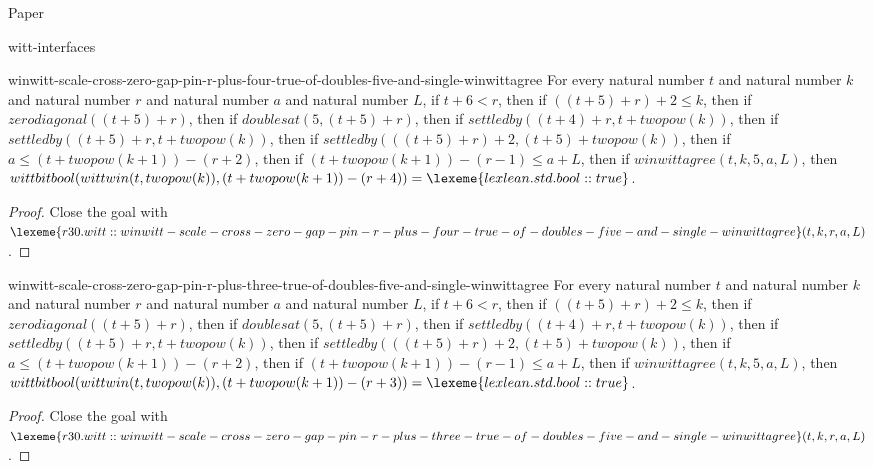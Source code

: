 \begin{lexlean}{Paper}
\begin{section}{witt-interfaces}
  \begin{theorem}{winwitt-scale-cross-zero-gap-pin-r-plus-four-true-of-doubles-five-and-single-winwittagree}
  For every natural number \(t\) and natural number \(k\) and natural number \(r\) and natural number \(a\) and natural number \(L\), if \(t + 6 < r\), then if \(((t + 5) + r) + 2 ≤ k\), then if \(zerodiagonal((t + 5) + r)\), then if \(doublesat(5, (t + 5) + r)\), then if \(settledby((t + 4) + r, t + twopow(k))\), then if \(settledby((t + 5) + r, t + twopow(k))\), then if \(settledby(((t + 5) + r) + 2, (t + 5) + twopow(k))\), then if \(a ≤ (t + twopow(k + 1)) - (r + 2)\), then if \((t + twopow(k + 1)) - (r - 1) ≤ a + L\), then if \(winwittagree(t, k, 5, a, L)\), then \(wittbitbool(wittwin(t, twopow(k)), (t + twopow(k + 1)) - (r + 4)) = \lexeme{lexlean.std.bool::true}\).
  \begin{proof}
  Close the goal with \(\lexeme{r30.witt::winwitt-scale-cross-zero-gap-pin-r-plus-four-true-of-doubles-five-and-single-winwittagree}(t, k, r, a, L)\).
  \end{proof}
  \end{theorem}

  \begin{theorem}{winwitt-scale-cross-zero-gap-pin-r-plus-three-true-of-doubles-five-and-single-winwittagree}
  For every natural number \(t\) and natural number \(k\) and natural number \(r\) and natural number \(a\) and natural number \(L\), if \(t + 6 < r\), then if \(((t + 5) + r) + 2 ≤ k\), then if \(zerodiagonal((t + 5) + r)\), then if \(doublesat(5, (t + 5) + r)\), then if \(settledby((t + 4) + r, t + twopow(k))\), then if \(settledby((t + 5) + r, t + twopow(k))\), then if \(settledby(((t + 5) + r) + 2, (t + 5) + twopow(k))\), then if \(a ≤ (t + twopow(k + 1)) - (r + 2)\), then if \((t + twopow(k + 1)) - (r - 1) ≤ a + L\), then if \(winwittagree(t, k, 5, a, L)\), then \(wittbitbool(wittwin(t, twopow(k)), (t + twopow(k + 1)) - (r + 3)) = \lexeme{lexlean.std.bool::true}\).
  \begin{proof}
  Close the goal with \(\lexeme{r30.witt::winwitt-scale-cross-zero-gap-pin-r-plus-three-true-of-doubles-five-and-single-winwittagree}(t, k, r, a, L)\).
  \end{proof}
  \end{theorem}


\end{section}
\end{lexlean}
